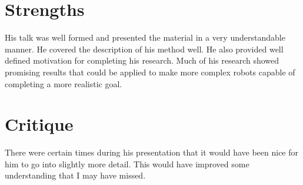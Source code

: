 \documentclass{article}
\begin{document}
\section*{Strengths}
His talk was well formed and presented the material in a very understandable manner. He covered the description of his method well. He also provided well defined motivation for completing his research. Much of his research showed promising results that could be applied to make more complex robots capable of completing a more realistic goal.
\section*{Critique}
There were certain times during his presentation that it would have been nice for him to go into slightly more detail. This would have improved some understanding that I may have missed.  
\cite{goossens93}
\end{document}
